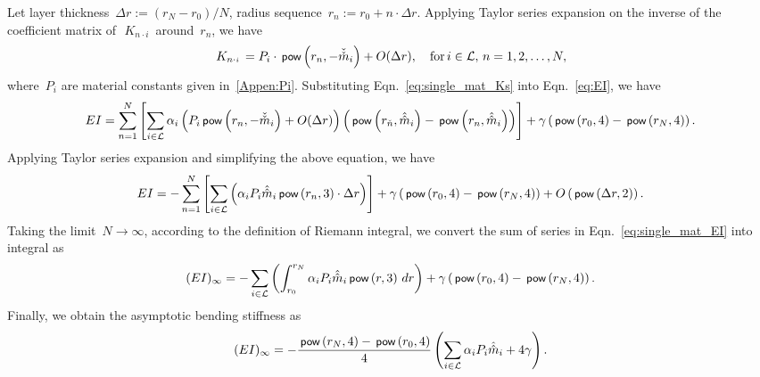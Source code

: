\documentclass[preprint,12pt,times]{elsarticle}
\newcommand{\plus}[1]{\hat{#1}}
\newcommand{\plusplus}[1]{\plus{\plus{#1}}}
\newcommand{\minus}[1]{\check{#1}}
\newcommand{\minusminus}[1]{\minus{\minus{#1}}}
\numberwithin{equation}{section}
\newcommand{\pr}[1]{\left( #1 \right)}
\newcommand{\p}{\,\textsf{\small pow}}
\newcommand{\Ksub}[2]{\,K_{ {#1}\cdot {\scriptscriptstyle #2}}\,}
\renewcommand{\>}{$\Rightarrow$}
\begin{document}
Let layer thickness~$\Delta r := \pr{r_{N}-r_{0}}/N$, radius sequence~$r_{n} := r_{0} + n\cdot \Delta r$. Applying Taylor series expansion on the inverse of the coefficient matrix of~$\Ksub{n}{i}$ around~$r_{n}$, we have
\begin{equation}
	\Ksub{n}{i} = P_i \cdot \p\pr{r_{n},- \minusminus{m}_i  } + O(\Delta r), \quad \text{for}\, i \in \mathcal{L},\, n = 1,2,\dots,N,
	\label{eq:single_mat_Ks}
\end{equation}
where~$P_i$ are material constants given in~\ref{Appen:Pi}. Substituting Eqn.~\eqref{eq:single_mat_Ks} into Eqn.~\eqref{eq:EI}, we have
\begin{equation*}
EI  = \sum_{n=1}^{N} \left[ \sum_{i \in \mathcal{L}} \alpha_i \left( P_i \p\pr{r_{n},- \minusminus{m}_i} + O(\Delta r) \right) \pr{\p\pr{r_{\minus{n}}, \plusplus{m}_i} - \p\pr{r_{n},\plusplus{m}_i}} \right] + \gamma \pr{\p\pr{r_{0},4} - \p\pr{r_{N},4}} .
\end{equation*}
Applying Taylor series expansion and simplifying the above equation, we have
\begin{equation}
	EI = - \sum_{n=1}^{N} \left[ \sum_{i \in \mathcal{L}} \left( \alpha_i P_i \plusplus{m}_i \p\pr{r_{n},3} \cdot \Delta r \right) \right] + \gamma \pr{\p\pr{r_{0},4} - \p\pr{r_{N},4}} + O\pr{\p\pr{\Delta r,2}}.
\label{eq:single_mat_EI}
\end{equation}
Taking the limit~$N \to \infty$, according to the definition of Riemann integral, we convert the sum of series in Eqn.~\eqref{eq:single_mat_EI} into integral as
\begin{equation*}
(EI)_{\infty}  = - \sum_{i \in \mathcal{L}} \left( \int_{r_{0}}^{r_{N}} \alpha_i P_i \plusplus{m}_i \p\pr{r,3} \, dr \right) + \gamma \pr{\p\pr{r_{0},4} - \p\pr{r_{N},4}}.
\end{equation*}
Finally, we obtain the asymptotic bending stiffness as
\begin{equation}
	(EI)_{\infty} =- \frac{\p\pr{r_{N},4} - \p\pr{r_{0},4}}{4} \left( \sum_{i \in \mathcal{L}} \alpha_i P_i \plusplus{m}_i + 4\gamma\right).
	\label{eq:single_mat_EI_final}
\end{equation}

\end{document}
